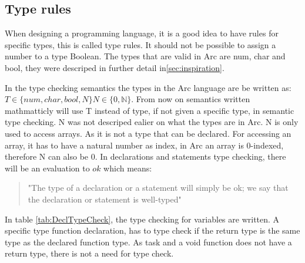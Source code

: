 \subsection{Type rules}\label{subsec:typerules}





When designing a programming language, it is a good idea to have rules for specific types, this is called type rules. It should not be possible to assign a number to a type Boolean. 
The types that are valid in Arc are num, char and bool, they were descriped in further detail in\ref*{sec:inspiration}.

In the type checking semantics the types in the Arc language are be written as:
$T \in \{num, char, bool, N\} N \in \{ 0,\mathbb{N}\}$.
From now on semantics written mathmatticly will use T instead of type, if not given a specific type, in semantic type checking.
N was not descriped ealier on what the types are in Arc. 
N is only used to access arrays. As it is not a type that can be declared. 
For accessing an array, it has to have a natural number as index, in Arc an array is 0-indexed, therefore N can also be 0.  
In declarations and statements type checking, there will be an evaluation to $ok$ which means: \begin{quote}
    "The type of a declaration or a statement will simply be ok; we say that
the declaration or statement is well-typed"\cite{Huttel2010}
\end{quote}

In table \ref*{tab:DeclTypeCheck}, the type checking for variables are written. A specific type function declaration, has to type check if the return type is the same type as the declared function type. As task and a void function does not have a return type, there is not a need for type check. 


